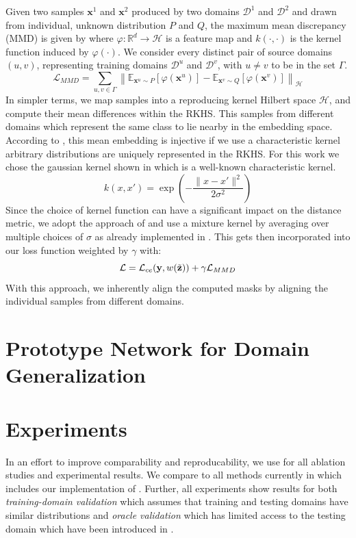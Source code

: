 Given two samples $\mathbf{x}^1$ and $\mathbf{x}^2$ produced by two domains $\mathcal{D}^1$ and $\mathcal{D}^2$ and drawn from individual, unknown distribution $P$ and $Q$, the maximum mean discrepancy (MMD) is given by  where $\varphi: \mathbb{R}^{d} \rightarrow \mathcal{H}$ is a feature map and $k(\cdot, \cdot)$ is the kernel function induced by $\varphi(\cdot)$. We consider every distinct pair of source domains $(u,v)$, representing training domains $\mathcal{D}^u$ and $\mathcal{D}^v$, with $u\neq v$ to be in the set $\Gamma$.
\begin{equation}
\label{eq:mmd_maps}
    \mathcal{L}_{MMD} =\sum_{u,v \in \Gamma}\left\|\mathbb{E}_{\mathbf{x}^u \sim P}[\varphi(\mathbf{x}^u)]-\mathbb{E}_{\mathbf{x}^v \sim Q}[\varphi(\mathbf{x}^v)]\right\|_{\mathcal{H}}
\end{equation}
In simpler terms, we map samples into a reproducing kernel Hilbert space $\mathcal{H}$, and compute their mean differences within the RKHS. This samples from different domains which represent the same class to lie nearby in the embedding space. According to \citet{SriperumbudurFGLS09}, this mean embedding is injective if we use a characteristic kernel \ie arbitrary distributions are uniquely represented in the RKHS. For this work we chose the gaussian kernel shown in  which is a well-known characteristic kernel.
\begin{equation}
\label{eq:gaussian_kernel}
    k(x,x') = \exp \left(-\frac{\|x-x'\|^{2}}{2 \sigma^{2}}\right)
\end{equation}
Since the choice of kernel function can have a significant impact on the distance metric, we adopt the approach of \citet{LiPWK18} and use a mixture kernel by averaging over multiple choices of $\sigma$ as already implemented in \domainbed. This gets then incorporated into our loss function weighted by $\gamma$ with:
\begin{equation}
    \mathcal{L} = \mathcal{L}_{ce}(\mathbf{y}, w(\Tilde{\mathbf{z}}))+\gamma \mathcal{L}_{MMD}
\end{equation}
With this approach, we inherently align the computed masks by aligning the individual samples from different domains. 

\section{Prototype Network for Domain Generalization}


\section{Experiments}
In an effort to improve comparability and reproducability, we use \domainbed \citep{gulrajani2020search} for all ablation studies and experimental results. We compare to all methods currently in \domainbed which includes our implementation of \rsc. Further, all experiments show results for both \emph{training-domain validation} which assumes that training and testing domains have similar distributions  and \emph{oracle validation} which has limited access to the testing domain which have been introduced in .

